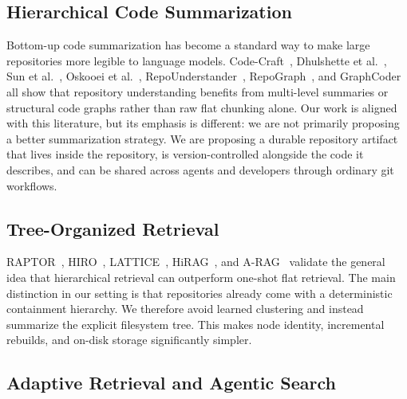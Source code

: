 \documentclass[11pt,a4paper]{article}
\begin{document}
\subsection{Hierarchical Code Summarization}

Bottom-up code summarization has become a standard way to make large repositories more legible to language models. Code-Craft~\cite{codecraft2025}, Dhulshette et al.~\cite{dhulshette2025}, Sun et al.~\cite{sun2025}, Oskooei et al.~\cite{oskooei2025}, RepoUnderstander~\cite{repounderstand2025}, RepoGraph~\cite{repograph2025}, and GraphCoder~\cite{graphcoder2024} all show that repository understanding benefits from multi-level summaries or structural code graphs rather than raw flat chunking alone. Our work is aligned with this literature, but its emphasis is different: we are not primarily proposing a better summarization strategy. We are proposing a durable repository artifact that lives inside the repository, is version-controlled alongside the code it describes, and can be shared across agents and developers through ordinary git workflows.

\subsection{Tree-Organized Retrieval}

RAPTOR~\cite{raptor2024}, HIRO~\cite{hiro2024}, LATTICE~\cite{lattice2025}, HiRAG~\cite{hirag2025}, and A-RAG~\cite{arag2025} validate the general idea that hierarchical retrieval can outperform one-shot flat retrieval. The main distinction in our setting is that repositories already come with a deterministic containment hierarchy. We therefore avoid learned clustering and instead summarize the explicit filesystem tree. This makes node identity, incremental rebuilds, and on-disk storage significantly simpler.

\subsection{Adaptive Retrieval and Agentic Search}
\end{document}
